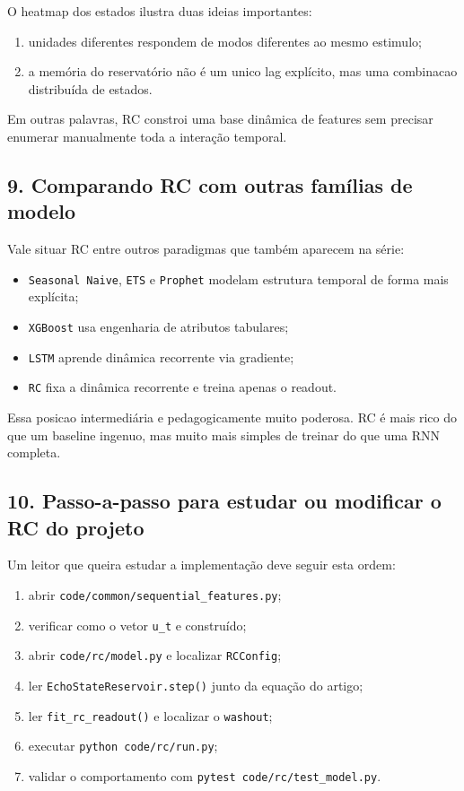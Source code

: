 \documentclass[12pt]{article}
\providecommand{\tightlist}{%
  \setlength{\itemsep}{0pt}\setlength{\parskip}{0pt}}
\begin{document}
O heatmap dos estados ilustra duas ideias importantes:

\begin{enumerate}
\def\labelenumi{\arabic{enumi}.}
\tightlist
\item
  unidades diferentes respondem de modos diferentes ao mesmo estimulo;
\item
  a memória do reservatório não é um unico lag explícito, mas uma combinacao distribuída de estados.
\end{enumerate}

Em outras palavras, RC constroi uma base dinâmica de features sem precisar enumerar manualmente toda a interação temporal.

\subsection{9. Comparando RC com outras famílias de modelo}\label{9-comparando-rc-com-outras-famuxedlias-de-modelo}

Vale situar RC entre outros paradigmas que também aparecem na série:

\begin{itemize}
\tightlist
\item
  \texttt{Seasonal\ Naive}, \texttt{ETS} e \texttt{Prophet} modelam estrutura temporal de forma mais explícita;
\item
  \texttt{XGBoost} usa engenharia de atributos tabulares;
\item
  \texttt{LSTM} aprende dinâmica recorrente via gradiente;
\item
  \texttt{RC} fixa a dinâmica recorrente e treina apenas o readout.
\end{itemize}

Essa posicao intermediária e pedagogicamente muito poderosa. RC é mais rico do que um baseline ingenuo, mas muito mais simples de treinar do que uma RNN completa.

\subsection{10. Passo-a-passo para estudar ou modificar o RC do projeto}\label{10-passo-a-passo-para-estudar-ou-modificar-o-rc-do-projeto}

Um leitor que queira estudar a implementação deve seguir esta ordem:

\begin{enumerate}
\def\labelenumi{\arabic{enumi}.}
\tightlist
\item
  abrir \texttt{code/common/sequential\_features.py};
\item
  verificar como o vetor \texttt{u\_t} e construído;
\item
  abrir \texttt{code/rc/model.py} e localizar \texttt{RCConfig};
\item
  ler \texttt{EchoStateReservoir.step()} junto da equação do artigo;
\item
  ler \texttt{fit\_rc\_readout()} e localizar o \texttt{washout};
\item
  executar \texttt{python\ code/rc/run.py};
\item
  validar o comportamento com \texttt{pytest\ code/rc/test\_model.py}.
\end{enumerate}
\end{document}
